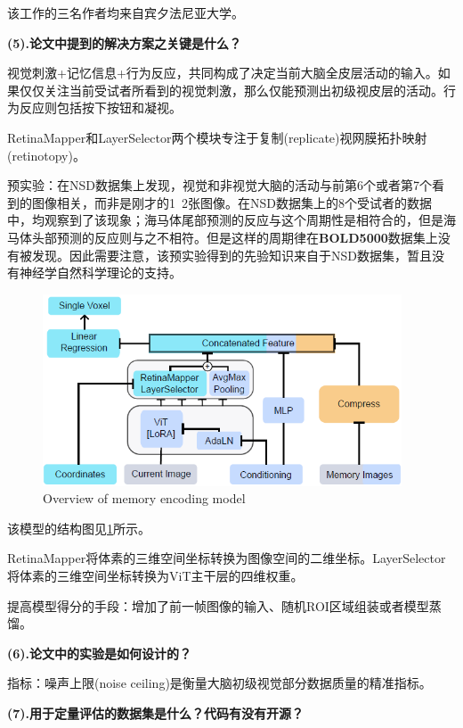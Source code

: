 \documentclass[12pt, a4paper, oneside]{ctexart}
\begin{document}
    该工作的三名作者均来自宾夕法尼亚大学。

    \noindent\textbf{(5).论文中提到的解决方案之关键是什么？}

    视觉刺激+记忆信息+行为反应，共同构成了决定当前大脑全皮层活动的输入。如果仅仅关注当前受试者所看到的视觉刺激，那么仅能预测出初级视皮层的活动。行为反应则包括按下按钮和凝视。

    RetinaMapper和LayerSelector两个模块专注于复制(replicate)视网膜拓扑映射(retinotopy\cite{Engel1997RetinotopicOI})。

    预实验：在NSD数据集上发现，视觉和非视觉大脑的活动与前第6个或者第7个看到的图像相关，而非是刚才的1~2张图像。在NSD数据集上的8个受试者的数据中，均观察到了该现象；海马体尾部预测的反应与这个周期性是相符合的，但是海马体头部预测的反应则与之不相符。但是这样的周期律在\textbf{BOLD5000}数据集上没有被发现。因此需要注意，该预实验得到的先验知识来自于NSD数据集，暂且没有神经学自然科学理论的支持。

    \begin{figure}[htbp]
        \centering
        \includegraphics[width=0.95\textwidth]{pic/4.6_memory encoding model}
        \caption{Overview of memory encoding model}
        \label{overview mem}
    \end{figure}

    该模型的结构图见\ref{overview mem}所示。

    RetinaMapper将体素的三维空间坐标转换为图像空间的二维坐标。LayerSelector将体素的三维空间坐标转换为ViT主干层的四维权重。

    提高模型得分的手段：增加了前一帧图像的输入、随机ROI区域组装或者模型蒸馏。

    \noindent\textbf{(6).论文中的实验是如何设计的？}

    指标：噪声上限(noise ceiling)是衡量大脑初级视觉部分数据质量的精准指标。

    \noindent\textbf{(7).用于定量评估的数据集是什么？代码有没有开源？}
\end{document}
